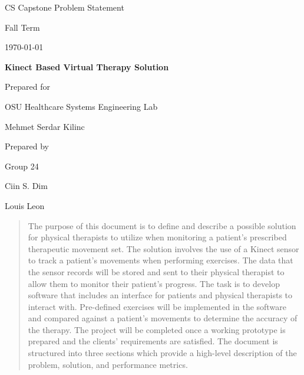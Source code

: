 \documentclass[onecolumn, draftclsnofoot,10pt, compsoc]{IEEEtran}
\def \CapstoneTeamName{     The Cleverly Named Team}
\def \CapstoneTeamNumber{       24}
\def \GroupMemberOne{            Ciin S. Dim}
\def \GroupMemberTwo{           Louis Leon}
\def \CapstoneProjectName{      Kinect Based Virtual Therapy Solution}
\def \CapstoneSponsorCompany{   OSU Healthcare Systems Engineering Lab}
\def \CapstoneSponsorPerson{        Mehmet Serdar Kilinc}
\def \DocType{      Problem Statement
                }
\newcommand{\NameSigPair}[1]{\par
\makebox[2.75in][r]{#1} \hfil   \makebox[3.25in]{\makebox[2.25in]{\hrulefill} \hfill        \makebox[.75in]{\hrulefill}}
\par\vspace{-12pt} \textit{\tiny\noindent
\makebox[2.75in]{} \hfil        \makebox[3.25in]{\makebox[2.25in][r]{Signature} \hfill  \makebox[.75in][r]{Date}}}}
\renewcommand{\NameSigPair}[1]{#1}
\begin{document}
\begin{titlepage}
    \begin{singlespace}
        \hfill 
        \par\vspace{.2in}
        \centering
        \scshape{
            \huge CS Capstone\DocType \par
            {\large Fall Term}\par
            {\large\today}\par
            \vspace{.5in}
            \textbf{\Huge\CapstoneProjectName}\par
            \vfill
            {\large Prepared for}\par
            \Huge \CapstoneSponsorCompany\par
            \vspace{5pt}
            {\Large\NameSigPair{\CapstoneSponsorPerson}\par}
            {\large Prepared by }\par
            Group\CapstoneTeamNumber\par
            \vspace{5pt}
            {\Large
                \NameSigPair{\GroupMemberOne}\par
                \NameSigPair{\GroupMemberTwo}\par
            }
            \vspace{20pt}
        }
        \begin{abstract}
            The purpose of this document is to define and describe a possible solution for physical therapists to utilize when monitoring a patient's prescribed therapeutic movement set. The solution involves the use of a Kinect sensor to track a patient's movements when performing exercises. The data that the sensor records will be stored and sent to their physical therapist to allow them to monitor their patient's progress. The task is to develop software that includes an interface for patients and physical therapists to interact with. Pre-defined exercises will be implemented in the software and compared against a patient's movements to determine the accuracy of the therapy. The project will be completed once a working prototype is prepared and the clients' requirements are satisfied. The document is structured into three sections which provide a high-level description of the problem, solution, and performance metrics.
        \end{abstract}     
    \end{singlespace}
\end{titlepage}
\newpage
{}
\tableofcontents
\clearpage
\end{document}
